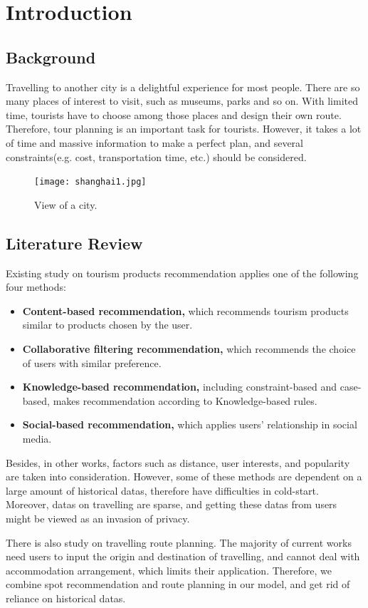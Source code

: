 \documentclass{mcmthesis}
\begin{document}
\newpage

\section{Introduction}	
\subsection{Background}
  Travelling to another city is a delightful experience for most people. There are so many places of interest to visit, such as museums, parks and so on. With limited time, tourists have to choose among those places and design their own route. Therefore, tour planning is an important task for tourists. However, it takes a lot of time and massive information to make a perfect plan, and several constraints(e.g. cost, transportation time, etc.) should be considered.
  \begin{figure}[h]
    \centering
    \texttt{[image: shanghai1.jpg]}
    \caption{View of a city.}
    \label{fig:city}
  \end{figure}
\subsection{Literature Review}
  Existing study on tourism products recommendation applies one of the following four methods\cite{wen2014survey}:
  \begin{itemize}
    \item \textbf{Content-based recommendation,} which recommends tourism products similar to products chosen by the user.
    \item \textbf{Collaborative filtering recommendation,} which recommends the choice of users with similar preference.
    \item \textbf{Knowledge-based recommendation,} including constraint-based\cite{wang2012research} and case-based, makes recommendation according to Knowledge-based rules.
    \item \textbf{Social-based recommendation,} which applies users' relationship in social media.
  \end{itemize}
  Besides, in other works, factors such as distance\cite{Zhang2017GeoPMF}, user interests\cite{Qingxia2016Personalized}, and popularity\cite{li2016personalized} are taken into consideration. However, some of these methods are dependent on a large amount of historical datas, therefore have difficulties in cold-start. Moreover, datas on travelling are sparse, and getting these datas from users might be viewed as an invasion of privacy. \par
  There is also study on travelling route planning\cite{hao2015intellegent}. The majority of current works need users to input the origin and destination of travelling, and cannot deal with accommodation arrangement, which limits their application. Therefore, we combine spot recommendation and route planning in our model, and get rid of reliance on historical datas.
\end{document}
